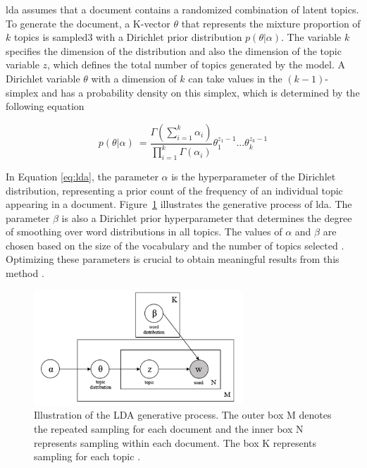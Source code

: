 \documentclass{article}
\begin{document}
 \acrshort{lda} assumes that a document contains a randomized combination of latent topics. To generate the document, a K-vector \(\theta\) that represents the mixture proportion of \(k\) topics is sampled3 with a Dirichlet prior distribution \(p(\theta|\alpha)\). The variable \(k\) specifies the dimension of the distribution and also the dimension of the topic variable \(z\), which defines the total number of topics generated by the model. A Dirichlet variable \(\theta\) with a dimension of \(k\) can take values in the \((k-1)\)-simplex and has a probability density on this simplex, which is determined by the following equation

\begin{equation} \label{eq:lda}
    p(\theta|\alpha)\ = \frac{\Gamma(\sum_{i=1}^{k} \alpha_{i})}{\prod_{i=1}^{k}\Gamma(\alpha_{i})}\theta_{1}^{z_{1}-1}...\theta_{k}^{z_{k}-1}
\end{equation}

In Equation \ref{eq:lda}, the parameter \(\alpha\) is the hyperparameter of the Dirichlet distribution, representing a prior count of the frequency of an individual topic appearing in a document. Figure~\ref{fig:lda} illustrates the generative process of \acrshort{lda}. The parameter \(\beta\) is also a Dirichlet prior hyperparameter that determines the degree of smoothing over word distributions in all topics. The values of \(\alpha\) and \(\beta\) are chosen based on the size of the vocabulary and the number of topics selected \citep{blei_latent_2003}. Optimizing these parameters is crucial to obtain meaningful results from this method \citep{vayansky_review_2020}. 

\begin{figure}
\centering
\includegraphics[width=0.7\textwidth]{figures/lda.png}
\caption{\label{fig:lda}Illustration of the LDA generative process. The outer box M denotes the repeated sampling for each document and the inner box N represents sampling within each document. The box K represents sampling for each topic \citep{vayansky_review_2020}.}
\end{figure}
\end{document}
